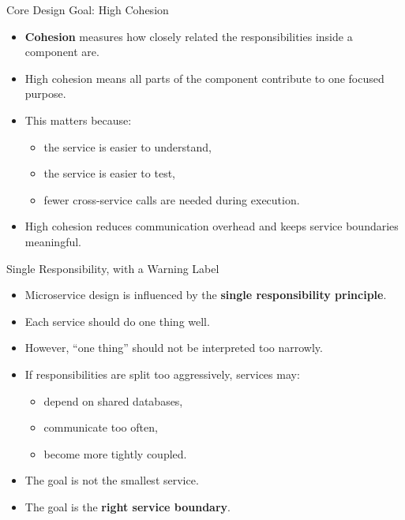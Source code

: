 \begin{frame}{Core Design Goal: High Cohesion}
\begin{itemize}
    \item \textbf{Cohesion} measures how closely related the responsibilities inside a component are.
    \item High cohesion means all parts of the component contribute to one focused purpose.
    \item This matters because:
    \begin{itemize}
        \item the service is easier to understand,
        \item the service is easier to test,
        \item fewer cross-service calls are needed during execution.
    \end{itemize}
    \item High cohesion reduces communication overhead and keeps service boundaries meaningful.
\end{itemize}
\end{frame}

\begin{frame}{Single Responsibility, with a Warning Label}
\begin{itemize}
    \item Microservice design is influenced by the \textbf{single responsibility principle}.
    \item Each service should do one thing well.
    \item However, ``one thing'' should not be interpreted too narrowly.
    \item If responsibilities are split too aggressively, services may:
    \begin{itemize}
        \item depend on shared databases,
        \item communicate too often,
        \item become more tightly coupled.
    \end{itemize}
    \item The goal is not the smallest service.
    \item The goal is the \textbf{right service boundary}.
\end{itemize}
\end{frame}

